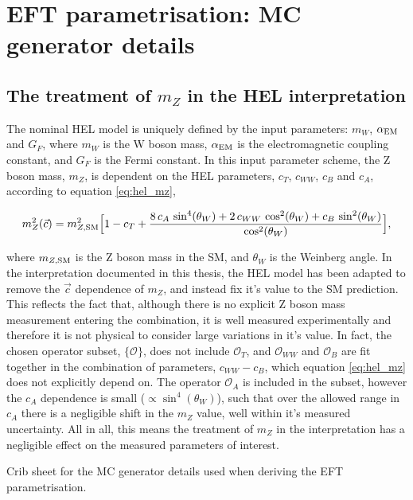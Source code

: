\chapter{EFT parametrisation: MC generator details}\label{app:generator_options}

\section{The treatment of $m_Z$ in the HEL interpretation}
The nominal HEL model is uniquely defined by the input parameters: $m_W$, $\alpha_{\rm{EM}}$ and $G_F$, where $m_W$ is the W boson mass, $\alpha_{\rm{EM}}$ is the electromagnetic coupling constant, and $G_F$ is the Fermi constant. In this input parameter scheme, the Z boson mass, $m_Z$, is dependent on the HEL parameters, $c_T$, $c_{WW}$, $c_B$ and $c_A$, according to equation \ref{eq:hel_mz},

\begin{equation}\label{eq:hel_mz}
    m_Z^2(\vec{c}) = m_{Z,\rm{SM}}^2 \Big[ 1-c_T+\frac{8\,c_A\,\sin^4(\theta_W)+2\,c_{WW}\,\cos^2(\theta_W)+c_B\,\sin^2(\theta_W)}{\cos^2(\theta_W)} \Big],
\end{equation}

\noindent
where $m_{Z,\rm{SM}}$ is the Z boson mass in the SM, and $\theta_W$ is the Weinberg angle. In the interpretation documented in this thesis, the HEL model has been adapted to remove the $\vec{c}$ dependence of $m_Z$, and instead fix it's value to the SM prediction. This reflects the fact that, although there is no explicit Z boson mass measurement entering the combination, it is well measured experimentally and therefore it is not physical to consider large variations in it's value. In fact, the chosen operator subset, $\{\mathcal{O}\}$, does not include $\mathcal{O}_T$, and $\mathcal{O}_{WW}$ and $\mathcal{O}_B$ are fit together in the combination of parameters, $c_{WW}-c_B$, which equation \ref{eq:hel_mz} does not explicitly depend on. The operator $\mathcal{O}_A$ is included in the subset, however the $c_A$ dependence is small ($\propto \sin^4(\theta_W)$), such that over the allowed range in $c_A$ there is a negligible shift in the $m_Z$ value, well within it's measured uncertainty. All in all, this means the treatment of $m_Z$ in the interpretation has a negligible effect on the measured parameters of interest.

\begin{table}[htb!]
  \centering
  \footnotesize
  \renewcommand{\arraystretch}{1.5}
  \setlength{\tabcolsep}{6pt}
  \caption[MC generator details for deriving the EFT parametrisation]
  {
    Crib sheet for the MC generator details used when deriving the EFT parametrisation.
  }
  \label{tab:generator_options}
  
\end{table}